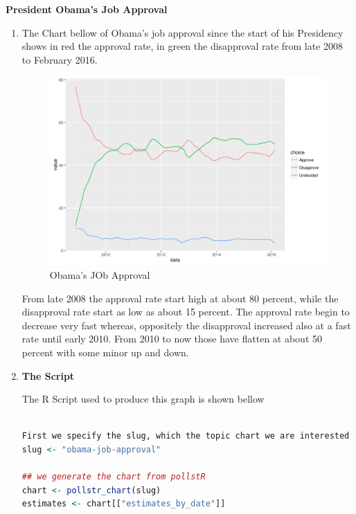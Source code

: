 \documentclass{article}[14pt]
\begin{document}
\begin{section}
{\bf \large President Obama's Job Approval}
\begin{enumerate}[]
\item {}


The Chart bellow of Obama's job approval since the start of his Presidency shows in red the approval rate, in green the disapproval rate from late 2008 to February 2016.

\begin{figure}[h]
\begin{center}
\includegraphics[width=\linewidth]{O_job_app}
\end{center}
\caption{Obama's JOb Approval}
\label{fig:figure4}
\end{figure}

From late 2008 the approval rate start high at about 80 percent, while the disapproval rate start as low as about 15 percent. The approval rate begin to decrease very fast whereas, oppositely the disapproval increased also at a fast rate until early 2010. From 2010 to now those have flatten at about 50 percent with some minor up and down.
\medspace

\item {\bf The Script}

The R Script used to produce this graph is shown bellow

\begin{lstlisting}[language = R]

First we specify the slug, which the topic chart we are interested in to
slug <- "obama-job-approval"

## we generate the chart from pollstR
chart <- pollstr_chart(slug)
estimates <- chart[["estimates_by_date"]]


\end{lstlisting}
\end{enumerate}
\end{section}
\end{document}
